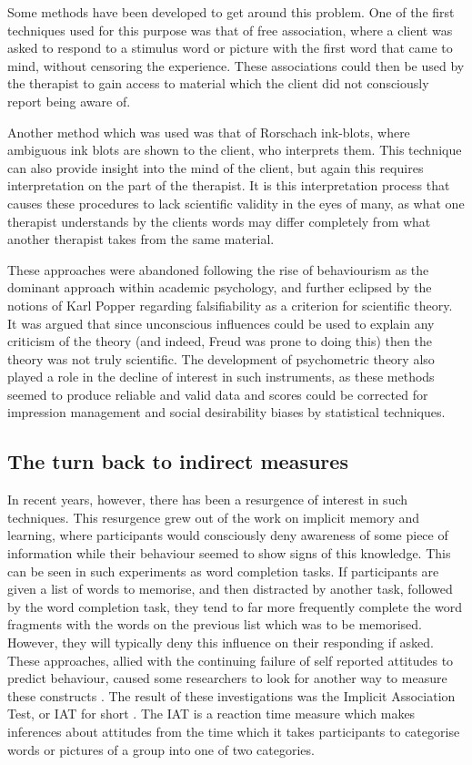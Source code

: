Some methods have been developed to get around this problem. One of the first techniques used for this purpose was that of free association, where a client was asked to respond to a stimulus word or picture with the first word that came to mind, without censoring the experience. These associations could then be used by the therapist to gain access to material which the client did not consciously report being aware of. 

Another method which was used was that of Rorschach ink-blots, where ambiguous ink blots are shown to the client, who interprets them. This technique can also provide insight into the mind of the client, but again this requires interpretation on the part of the therapist. It is this interpretation process that causes these procedures to lack scientific validity in the eyes of many, as what one therapist understands by the clients words may differ completely from what another therapist takes from the same material. 

These approaches were abandoned following the rise of behaviourism as the dominant approach within academic psychology, and further eclipsed by the notions of Karl Popper regarding falsifiability as a criterion for scientific theory. It was argued that since unconscious influences could be used to explain any criticism of the theory (and indeed, Freud was prone to doing this) then the theory was not truly scientific. The development of psychometric theory also played a role in the decline of interest in such instruments, as these methods seemed to produce reliable and valid data and scores could be corrected for impression management and social desirability biases by statistical techniques. 

\subsection{The turn back to indirect measures}

In recent years, however, there has been a resurgence of interest in such techniques. This resurgence grew out of the work on implicit memory and learning, where participants would consciously deny awareness of some piece of information while their behaviour seemed to show signs of this knowledge.  This can be seen in such experiments as word completion tasks. If participants are given a list of words to memorise, and then distracted by another task, followed by the word completion task, they tend to far more frequently complete the word fragments with the words on the previous list which was to be memorised.  However, they will typically deny this influence on their responding if asked. These approaches, allied with the continuing failure of self reported attitudes to predict behaviour, caused some researchers to look for another way to measure these constructs \cite{Greenwald1995a}. The result of these investigations was the Implicit Association Test, or IAT for short \cite{Greenwald1998}. The IAT is a reaction time measure which makes inferences about attitudes from the time which it takes participants to categorise words or pictures of a group into one of two categories. 

